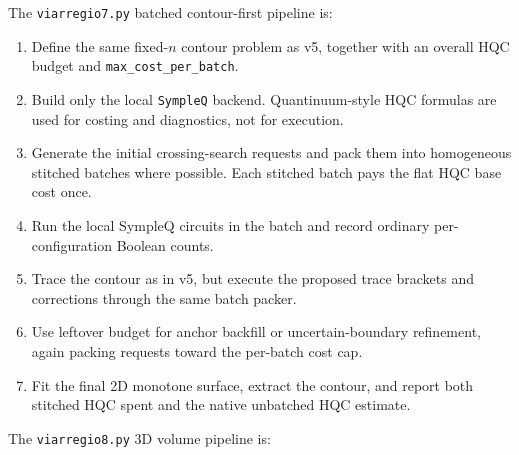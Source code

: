 The \texttt{viarregio7.py} batched contour-first pipeline is:

\begin{enumerate}
    \item Define the same fixed-\(n\) contour problem as v5, together with an
    overall HQC budget and \texttt{max\_cost\_per\_batch}.

    \item Build only the local \texttt{SympleQ} backend.  Quantinuum-style HQC
    formulas are used for costing and diagnostics, not for execution.

    \item Generate the initial crossing-search requests and pack them into
    homogeneous stitched batches where possible.  Each stitched batch pays the
    flat HQC base cost once.

    \item Run the local SympleQ circuits in the batch and record ordinary
    per-configuration Boolean counts.

    \item Trace the contour as in v5, but execute the proposed trace brackets
    and corrections through the same batch packer.

    \item Use leftover budget for anchor backfill or uncertain-boundary
    refinement, again packing requests toward the per-batch cost cap.

    \item Fit the final 2D monotone surface, extract the contour, and report
    both stitched HQC spent and the native unbatched HQC estimate.
\end{enumerate}

The \texttt{viarregio8.py} 3D volume pipeline is:

